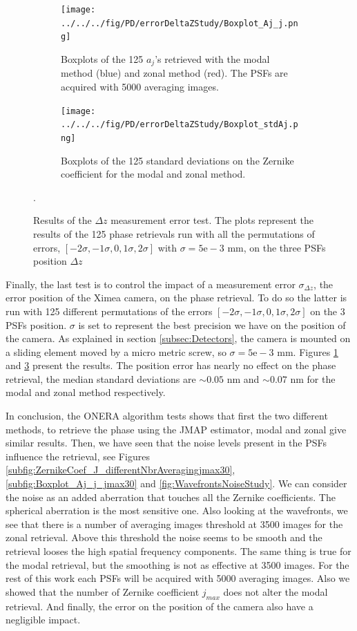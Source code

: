 \begin{figure}
\centering
    \begin{subfigure}{0.45\textwidth}
        \texttt{[image: ../../../fig/PD/errorDeltaZStudy/Boxplot\_Aj\_j.png]}
        \caption{Boxplots of the 125 $a_j$'s retrieved with the modal method (blue) and zonal method (red). The PSFs are acquired with 5000 averaging images.}
        \label{subfig:Boxplot_Aj_j}
    \end{subfigure}
    \quad
    \begin{subfigure}{0.45\textwidth}
        \texttt{[image: ../../../fig/PD/errorDeltaZStudy/Boxplot\_stdAj.png]}
        \caption{Boxplots of the 125 standard deviations on the Zernike coefficient for the modal and zonal method.}
        \label{subfig:Boxplot_stdAj}
    \end{subfigure}
    \decoRule
    \caption{Results of the $\Delta z$ measurement error test. The plots represent the results of the 125 phase retrievals run with all the permutations of errors, $[-2\sigma,-1\sigma,0,1\sigma,2\sigma]$ with $\sigma = 5\mathrm{e}-3$ mm, on the three PSFs position $\Delta z$}.
\end{figure}

Finally, the last test is to control the impact of a measurement error $\sigma_{\Delta z}$, the error position of the Ximea camera, on the phase retrieval. To do so the latter is run with 125 different permutations of the errors $[-2\sigma,-1\sigma,0,1\sigma,2\sigma]$ on the 3 PSFs position. $\sigma$ is set to represent the best precision we have on the position of the camera. As explained in section \ref{subsec:Detectors}, the camera is mounted on a sliding element moved by a micro metric screw, so $\sigma = 5\mathrm{e}-3$ mm. Figures \ref{subfig:Boxplot_Aj_j} and \ref{subfig:Boxplot_stdAj} present the results. The position error has nearly no effect on the phase retrieval, the median standard deviations are $\sim0.05$ nm and $\sim0.07$ nm for the modal and zonal method respectively.

In conclusion, the ONERA algorithm tests shows that first the two different methods, to retrieve the phase using the JMAP estimator, modal and zonal give similar results. Then, we have seen that the noise levels present in the PSFs influence the retrieval, see Figures \ref{subfig:ZernikeCoef_J_differentNbrAveragingjmax30}, \ref{subfig:Boxplot_Aj_j_jmax30} and \ref{fig:WavefrontsNoiseStudy}. We can consider the noise as an added aberration that touches all the Zernike coefficients. The spherical aberration is the most sensitive one. Also looking at the wavefronts, we see that there is a number of averaging images threshold at 3500 images for the zonal retrieval. Above this threshold the noise seems to be smooth and the retrieval looses the high spatial frequency components. The same thing is true for the modal retrieval, but the smoothing is not as effective at 3500 images. For the rest of this work each PSFs will be acquired with 5000 averaging images. Also we showed that the number of Zernike coefficient $j_{max}$ does not alter the modal retrieval. And finally, the error on the position of the camera also have a negligible impact.

